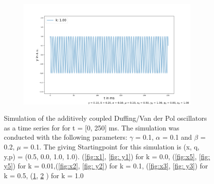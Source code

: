 \documentclass[oneside,10pt,a4paper]{report}
\begin{document}
\begin{figure}[H]
\begin{subfigure}[b]{0.45\textwidth}
				\caption{}
				\label{fig:x4}
			\end{subfigure}
			\hfill
			\begin{subfigure}[b]{0.45\textwidth}
				\includegraphics[width=\textwidth]{y_k4.png}
				\caption{}
				\label{fig: y4}
			\end{subfigure}
			\caption{Simulation of the additively coupled Duffing/Van der Pol oscillators as a time series for for t = [0, 250] ms. 
				The simulation was conducted with the following parameters: $\gamma$ = 0.1, $\alpha$ = 0.1 and $\beta$ = 0.2, $\mu$ = 0.1. The giving Startingpoint for this simulation is (x, q, y,p) = (0.5, 0.0, 1.0, 1.0).
				 (\ref{fig:x1}, \ref{fig: y1}) for k = 0.0, (\ref{fig:x5}, \ref{fig: y5}) for k = 0.01,(\ref{fig:x2}, \ref{fig: y2}) for k = 0.1, (\ref{fig:x3}, \ref{fig: y3}) for k = 0.5, (\ref{fig:x4}, \ref{fig: y4} ) for k = 1.0}
			\label{fig: timekurve_k}
		\end{figure}
		
\end{document}
